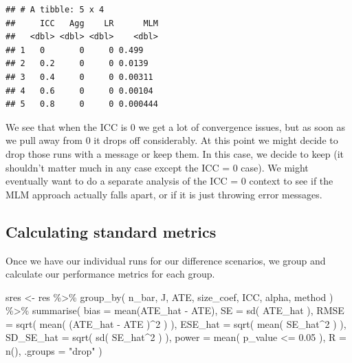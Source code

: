 \documentclass[
]{book}
\newenvironment{Shaded}{\begin{snugshade}}{\end{snugshade}}
\newcommand{\AttributeTok}[1]{\textcolor[rgb]{0.77,0.63,0.00}{#1}}
\newcommand{\DecValTok}[1]{\textcolor[rgb]{0.00,0.00,0.81}{#1}}
\newcommand{\FloatTok}[1]{\textcolor[rgb]{0.00,0.00,0.81}{#1}}
\newcommand{\FunctionTok}[1]{\textcolor[rgb]{0.00,0.00,0.00}{#1}}
\newcommand{\NormalTok}[1]{#1}
\newcommand{\OtherTok}[1]{\textcolor[rgb]{0.56,0.35,0.01}{#1}}
\newcommand{\SpecialCharTok}[1]{\textcolor[rgb]{0.00,0.00,0.00}{#1}}
\newcommand{\StringTok}[1]{\textcolor[rgb]{0.31,0.60,0.02}{#1}}
\begin{document}
\begin{verbatim}
## # A tibble: 5 x 4
##     ICC   Agg    LR      MLM
##   <dbl> <dbl> <dbl>    <dbl>
## 1   0       0     0 0.499   
## 2   0.2     0     0 0.0139  
## 3   0.4     0     0 0.00311 
## 4   0.6     0     0 0.00104 
## 5   0.8     0     0 0.000444
\end{verbatim}

We see that when the ICC is 0 we get a lot of convergence issues, but as soon as we pull away from 0 it drops off considerably.
At this point we might decide to drop those runs with a message or keep them.
In this case, we decide to keep (it shouldn't matter much in any case except the ICC = 0 case).
We might eventually want to do a separate analysis of the ICC = 0 context to see if the MLM approach actually falls apart, or if it is just throwing error messages.

\hypertarget{calculating-standard-metrics}{%
\subsection{Calculating standard metrics}\label{calculating-standard-metrics}}

Once we have our individual runs for our difference scenarios, we group and calculate our performance metrics for each group.

\begin{Shaded}
\begin{Highlighting}[]
\NormalTok{sres }\OtherTok{\textless{}{-}} 
\NormalTok{  res }\SpecialCharTok{\%\textgreater{}\%} 
  \FunctionTok{group\_by}\NormalTok{( n\_bar, J, ATE, size\_coef, ICC, alpha, method ) }\SpecialCharTok{\%\textgreater{}\%}
  \FunctionTok{summarise}\NormalTok{( }
    \AttributeTok{bias =} \FunctionTok{mean}\NormalTok{(ATE\_hat }\SpecialCharTok{{-}}\NormalTok{ ATE),}
    \AttributeTok{SE =} \FunctionTok{sd}\NormalTok{( ATE\_hat ),}
    \AttributeTok{RMSE =} \FunctionTok{sqrt}\NormalTok{( }\FunctionTok{mean}\NormalTok{( (ATE\_hat }\SpecialCharTok{{-}}\NormalTok{ ATE )}\SpecialCharTok{\^{}}\DecValTok{2}\NormalTok{ ) ),}
    \AttributeTok{ESE\_hat =} \FunctionTok{sqrt}\NormalTok{( }\FunctionTok{mean}\NormalTok{( SE\_hat}\SpecialCharTok{\^{}}\DecValTok{2}\NormalTok{ ) ),}
    \AttributeTok{SD\_SE\_hat =} \FunctionTok{sqrt}\NormalTok{( }\FunctionTok{sd}\NormalTok{( SE\_hat}\SpecialCharTok{\^{}}\DecValTok{2}\NormalTok{ ) ),}
    \AttributeTok{power =} \FunctionTok{mean}\NormalTok{( p\_value }\SpecialCharTok{\textless{}=} \FloatTok{0.05}\NormalTok{ ),}
    \AttributeTok{R =} \FunctionTok{n}\NormalTok{(),}
    \AttributeTok{.groups =} \StringTok{"drop"}
\NormalTok{  )}
\end{Highlighting}
\end{Shaded}
\end{document}

